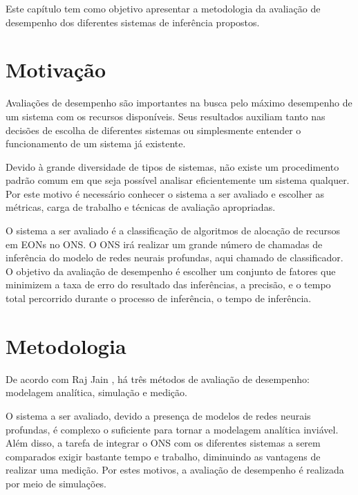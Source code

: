 Este capítulo tem como objetivo apresentar a metodologia da avaliação de desempenho dos diferentes sistemas de inferência propostos.


\section{Motivação}%

Avaliações de desempenho são importantes na busca pelo máximo desempenho de um sistema com os recursos disponíveis. Seus resultados auxiliam tanto nas decisões de escolha de diferentes sistemas ou simplesmente entender o funcionamento de um sistema já existente.

Devido à grande diversidade de tipos de sistemas, não existe um procedimento padrão comum em que seja possível analisar eficientemente um sistema qualquer. Por este motivo é necessário conhecer o sistema a ser avaliado e escolher as métricas, carga de trabalho e técnicas de avaliação apropriadas. \cite{jain1991art}

O sistema a ser avaliado é a classificação de algoritmos de alocação de recursos em EONs no ONS. O ONS irá realizar um grande número de chamadas de inferência do modelo de redes neurais profundas, aqui chamado de classificador. O objetivo da avaliação de desempenho é escolher um conjunto de fatores que minimizem a taxa de erro do resultado das inferências, a precisão, e o tempo total percorrido durante o processo de inferência, o tempo de inferência.


\section{Metodologia}%

De acordo com Raj Jain \cite{jain1991art}, há três métodos de avaliação de desempenho: modelagem analítica, simulação e medição.

O sistema a ser avaliado, devido a presença de modelos de redes neurais profundas, é complexo o suficiente para tornar a modelagem analítica inviável. Além disso, a tarefa de integrar o ONS com os diferentes sistemas a serem comparados exigir bastante tempo e trabalho, diminuindo as vantagens de realizar uma medição. Por estes motivos, a avaliação de desempenho é realizada por meio de simulações.

